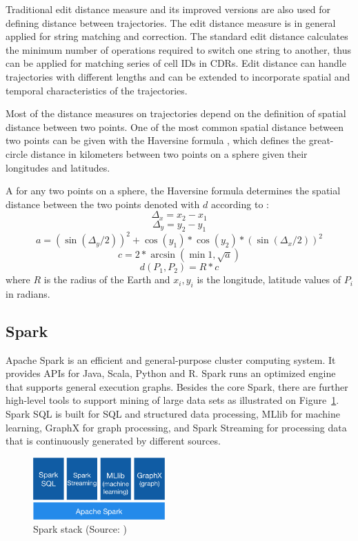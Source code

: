 Traditional edit distance measure and its improved versions are also used for defining distance between trajectories. 
The edit distance measure is in general applied for string matching and correction. The standard edit distance calculates the minimum number of operations required to switch one string to another, thus can be applied for matching series of cell IDs in CDRs. Edit distance can handle trajectories with different lengths and can be extended to incorporate spatial and temporal characteristics of the trajectories. \cite{spatial_edit}

Most of the distance measures on trajectories depend on the definition of spatial distance between two points. One of the most common spatial distance between two points can be given with the Haversine formula \cite{haversine}, which  defines the great-circle distance in kilometers between two points on a sphere given their longitudes and latitudes.

\begin{definition}
A for any two points on a sphere, the Haversine formula determines the spatial distance between the two points denoted with $d$ according to \cite{haversine}:
    \[\Delta_{x} = x_{2} - x_{1}\]
    \[\Delta_{y} = y_{2} - y_{1}\]
    \[a = (\sin(\Delta_{y}/2))^2 + \cos{(y_{1})} * \cos{(y_{2})} * (\sin{(\Delta_{x}/2)})^2 \]
    \[c = 2 * \arcsin{(\min{1,\sqrt{a}})}\]
    \[d(P_{1}, P_{2}) = R * c\]
    where $R$ is the radius of the Earth and $x_{i}, y_{i}$ is the longitude, latitude values of $P_{i}$ in radians.
\end{definition}


\subsection{Spark}
Apache Spark is an efficient and general-purpose cluster computing system. It provides APIs for Java, Scala, Python and R. Spark runs an optimized engine that supports general execution graphs. Besides the core Spark, there are further high-level tools to support mining of large data sets as illustrated on Figure~\ref{fig:spark}. Spark SQL is built for SQL and structured data processing, MLlib for machine learning, GraphX for graph processing, and Spark Streaming for processing data that is continuously generated by different sources.
\begin{figure}[h]
    \centering
    \includegraphics[width=0.45\textwidth]{images/spark-stack}
    \caption{Spark stack (Source: \cite{spark})}
    \label{fig:spark}
\end{figure}

